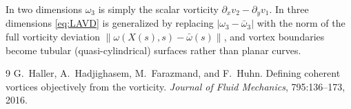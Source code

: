\documentclass[../main.tex]{subfiles}
\begin{document}
\begin{reminder}[2D vs.\ 3D]
In two dimensions $\omega_3$ is simply the scalar vorticity $\partial_x v_2 - \partial_y v_1$. In three dimensions \eqref{eq:LAVD} is generalized by replacing $|\omega_3 - \bar\omega_3|$ with the norm of the full vorticity deviation $\|\omega(X(s),s) - \bar\omega(s)\|$, and vortex boundaries become tubular (quasi-cylindrical) surfaces rather than planar curves.
\end{reminder}


\begin{thebibliography}{9}
G.~Haller, A.~Hadjighasem, M.~Farazmand, and F.~Huhn.
\newblock Defining coherent vortices objectively from the vorticity.
\newblock \emph{Journal of Fluid Mechanics}, 795:136--173, 2016.
\end{thebibliography}
\end{document}
